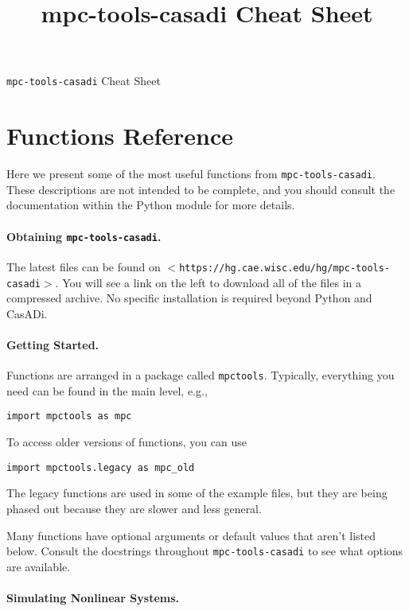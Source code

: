 \documentclass{article}
\title{mpc-tools-casadi Cheat Sheet}
\newcommand{\smallurl}[2][\scriptsize]{\texttt{#1$<$#2$>$}}
\newcommand{\casadi}{CasADi}
\begin{document}

\begin{center}
    \LARGE \texttt{mpc-tools-casadi} Cheat Sheet
\end{center}

\section{Functions Reference}

Here we present some of the most useful functions from \texttt{mpc-tools-casadi}.
These descriptions are not intended to be complete, and you should consult the documentation within the Python module for more details.

\begin{multicols}{2}

\paragraph*{Obtaining \texttt{mpc-tools-casadi}.}

The latest files can be found on \smallurl{https://hg.cae.wisc.edu/hg/mpc-tools-casadi}.
You will see a link on the left to download all of the files in a compressed archive.
No specific installation is required beyond Python and \casadi{}.

\paragraph*{Getting Started.}

Functions are arranged in a package called \texttt{mpctools}.
Typically, everything you need can be found in the main level, e.g.,
%
\begin{lstlisting}[frame=L]
import mpctools as mpc
\end{lstlisting}
%
To access older versions of functions, you can use
%
\begin{lstlisting}[frame=L]
import mpctools.legacy as mpc_old
\end{lstlisting}
%
The legacy functions are used in some of the example files, but they are being phased out because they are slower and less general.

Many functions have optional arguments or default values that aren't listed below.
Consult the docstrings throughout \texttt{mpc-tools-casadi} to see what options are available.

\paragraph*{Simulating Nonlinear Systems.}


\end{multicols}
\end{document}
